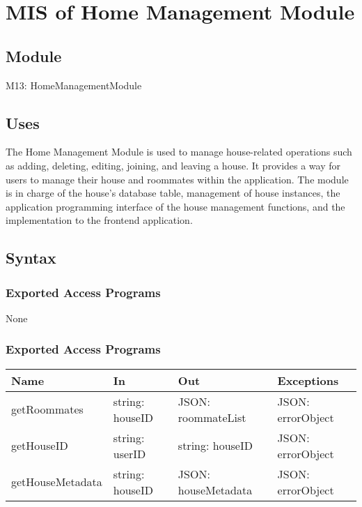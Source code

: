 \documentclass[12pt, titlepage]{article}
\begin{document}
\newpage


\section{MIS of Home Management Module} \label{Module} 

\subsection{Module}

M13: HomeManagementModule

\subsection{Uses}

The Home Management Module is used to manage house-related operations such as adding, deleting, editing, joining, and leaving a house. It provides a way for users to manage their house and roommates within the application. The module is in charge of the house's database table, management of house instances, the application programming interface of the house management functions, and the implementation to the frontend application.

\subsection{Syntax}

\subsubsection{Exported Access Programs}
None

\subsubsection{Exported Access Programs}

\begin{center}
\begin{tabular}{p{3cm} p{4cm} p{5cm} p{3.5cm}}
\hline
\textbf{Name} & \textbf{In} & \textbf{Out} & \textbf{Exceptions} \\
\hline
getRoommates & string: houseID & JSON: roommateList & JSON: errorObject \\
getHouseID & string: userID & string: houseID & JSON: errorObject \\
getHouseMetadata & string: houseID & JSON: houseMetadata & JSON: errorObject \\
\hline
\end{tabular}
\end{center}
\end{document}
